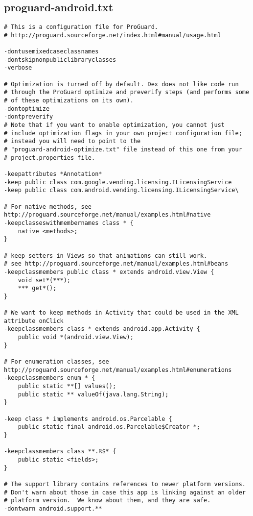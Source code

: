 \subsection{proguard-android.txt}
\label{app:opa}
\begin{lstlisting}
# This is a configuration file for ProGuard.
# http://proguard.sourceforge.net/index.html#manual/usage.html

-dontusemixedcaseclassnames
-dontskipnonpubliclibraryclasses
-verbose

# Optimization is turned off by default. Dex does not like code run
# through the ProGuard optimize and preverify steps (and performs some
# of these optimizations on its own).
-dontoptimize
-dontpreverify
# Note that if you want to enable optimization, you cannot just
# include optimization flags in your own project configuration file;
# instead you will need to point to the
# "proguard-android-optimize.txt" file instead of this one from your
# project.properties file.

-keepattributes *Annotation*
-keep public class com.google.vending.licensing.ILicensingService
-keep public class com.android.vending.licensing.ILicensingService\

# For native methods, see http://proguard.sourceforge.net/manual/examples.html#native
-keepclasseswithmembernames class * {
    native <methods>;
}

# keep setters in Views so that animations can still work.
# see http://proguard.sourceforge.net/manual/examples.html#beans
-keepclassmembers public class * extends android.view.View {
    void set*(***);
    *** get*();
}

# We want to keep methods in Activity that could be used in the XML attribute onClick
-keepclassmembers class * extends android.app.Activity {
    public void *(android.view.View);
}

# For enumeration classes, see http://proguard.sourceforge.net/manual/examples.html#enumerations
-keepclassmembers enum * {
    public static **[] values();
    public static ** valueOf(java.lang.String);
}

-keep class * implements android.os.Parcelable {
    public static final android.os.Parcelable$Creator *;
}

-keepclassmembers class **.R$* {
    public static <fields>;
}

# The support library contains references to newer platform versions.
# Don't warn about those in case this app is linking against an older
# platform version.  We know about them, and they are safe.
-dontwarn android.support.**
\end{lstlisting}
